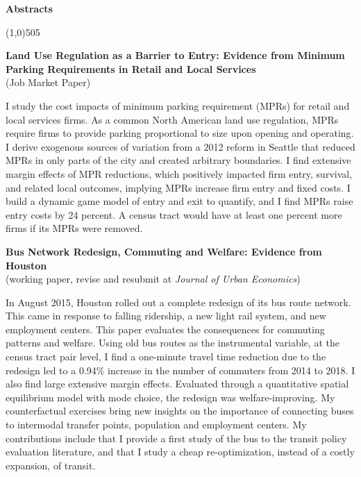 \documentclass[11pt, a4paper]{article}
\begin{document}
{{\newpage
\begin{center}
\LARGE
\textbf{Abstracts}
\normalsize
\end{center}
\line(1,0){505}

\begin{center}
\LARGE
\textbf{Land Use Regulation as a Barrier to Entry: Evidence from Minimum Parking Requirements in Retail and Local Services}\\
\large
(Job Market Paper)
\normalsize
\end{center}

I study the cost impacts of minimum parking requirement (MPRs) for retail and local services firms. As a common North American land use regulation, MPRs require firms to provide parking proportional to size upon opening and operating. I derive exogenous sources of variation from a 2012 reform in Seattle that reduced MPRs in only parts of the city and created arbitrary boundaries. I find extensive margin effects of MPR reductions, which positively impacted firm entry, survival, and related local outcomes, implying MPRs increase firm entry and fixed costs. I build a dynamic game model of entry and exit to quantify, and I find MPRs raise entry costs by 24 percent. A census tract would have at least one percent more firms if its MPRs were removed. \\

\bigskip
\begin{center}
\LARGE
\textbf{Bus Network Redesign, Commuting and Welfare: Evidence from Houston}\\
\large
(working paper, revise and resubmit at \textit{Journal of Urban Economics})
\normalsize
\end{center}
In August 2015, Houston rolled out a complete redesign of its bus route network. This came in response to falling ridership, a new light rail system, and new employment centers. This paper evaluates the consequences for commuting patterns and welfare. Using old bus routes as the instrumental variable, at the census tract pair level, I find a one-minute travel time reduction due to the redesign led to a 0.94\% increase in the number of commuters from 2014 to 2018. I also find large extensive margin effects. Evaluated through a quantitative spatial equilibrium model with mode choice, the redesign was welfare-improving. My counterfactual exercises bring new insights on the importance of connecting buses to intermodal transfer points, population and employment centers. My contributions include that I provide a first study of the bus to the transit policy evaluation literature, and that I study a cheap re-optimization, instead of a costly expansion, of transit.

}}
\end{document}
